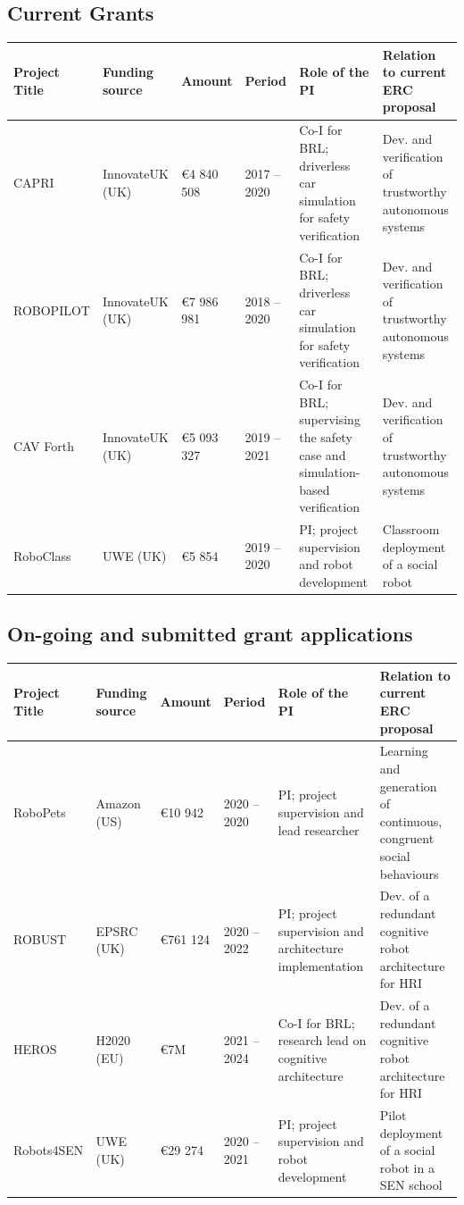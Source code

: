 \documentclass[11pt,a4paper]{report}
\begin{document}
\subsection{Current Grants}

\begin{tabular}{p{1.8cm}p{1.8cm}llp{4cm}p{4cm}}
\toprule
\textbf{Project Title} & \textbf{Funding source} & \textbf{Amount} & \textbf{Period} & \textbf{Role of the PI} & \textbf{Relation to current  ERC proposal} \\ \midrule
    CAPRI & InnovateUK (UK) & €4 840 508 & 2017 -- 2020 & Co-I for BRL; driverless car simulation for safety verification & Dev. and verification of trustworthy autonomous systems \\ \midrule
    ROBOPILOT & InnovateUK (UK) & €7 986 981 & 2018 -- 2020 & Co-I for BRL; driverless car simulation for safety verification & Dev. and verification of trustworthy autonomous systems \\ \midrule
    CAV Forth & InnovateUK (UK) & €5 093 327 & 2019 -- 2021 & Co-I for BRL; supervising the safety case and simulation-based verification & Dev. and verification of trustworthy autonomous systems \\ \midrule
    RoboClass & UWE (UK) & €5 854 & 2019 -- 2020 & PI; project supervision and robot development & Classroom deployment of a social robot \\ \bottomrule
\end{tabular}

\subsection{On-going and submitted grant applications}

\begin{tabular}{p{1.8cm}p{1.8cm}llp{4cm}p{4cm}}
\toprule
\textbf{Project Title} & \textbf{Funding source} & \textbf{Amount} & \textbf{Period} & \textbf{Role of the PI} & \textbf{Relation to current  ERC proposal} \\ \midrule
    RoboPets & Amazon (US) & €10 942 & 2020 -- 2020 & PI; project supervision and lead researcher & Learning and generation of continuous, congruent social behaviours \\ \midrule
    ROBUST & EPSRC (UK) & €761 124 & 2020 -- 2022 & PI; project supervision and
    architecture implementation & Dev. of a redundant cognitive robot architecture for HRI \\ \midrule
    HEROS & H2020 (EU) & €7M & 2021 -- 2024 & Co-I for BRL; research
    lead on cognitive architecture & Dev. of a redundant cognitive robot architecture for HRI \\ \midrule
    Robots4SEN & UWE (UK) & €29 274 & 2020 -- 2021 & PI; project supervision and robot development & Pilot deployment of a social robot in a SEN school \\ \bottomrule
\end{tabular}
\end{document}
